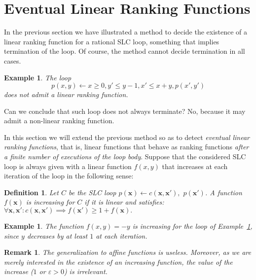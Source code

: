 \documentclass{acm_proc_article-sp}
\newtheorem{definition}[theorem]{Definition}
\newtheorem{example}[theorem]{Example}
\newtheorem{remark}[theorem]{Remark}
\newcommand{\itc}{\mathrel{:}}
\begin{document}
\section{Eventual Linear Ranking Functions}
\label{sec:eventual-linear-ranking-functions}

In the previous section we have illustrated a method to decide
the existence of a linear ranking function for a rational SLC loop,
something that implies termination of the loop.
Of course, the method cannot decide termination in all cases.

\begin{example}
\label{ex-fn-rng-lin-evt-p}
The loop
\[
  p(x, y) \leftarrow x \ge 0, y' \le y - 1, x' \le x + y, p(x', y')
\]
does not admit a linear ranking function.
\end{example}

Can we conclude that such loop does not always terminate?
No, because it may admit a non-linear ranking function.

In this section we will extend the previous method so as to detect
\emph{eventual linear ranking functions}, that is, linear functions
that behave as ranking functions
\emph{after a finite number of executions of the loop body}.
Suppose that the considered SLC loop is always given with
a linear function $f(x, y)$ that increases at each
iteration of the loop in the following sense:

\begin{definition}
\label{def-inc-lin-fn}
Let $C$ be the SLC loop
$p(\mathbf{x}) \leftarrow c(\mathbf{x}, \mathbf{x}'),$ $p(\mathbf{x}')$.
A function $f(\mathbf{x})$ is \emph{increasing for $C$}
if it is linear and satisfies:
$
  \forall \mathbf{x}, \mathbf{x}'
    \itc
      c(\mathbf{x}, \mathbf{x}')
        \implies f(\mathbf{x}') \ge 1 + f(\mathbf{x}).
$
\end{definition}

\begin{example}
\label{ex-fn-rng-lin-evt-f}
The function $f(x, y) = -y$ is increasing for the loop of
\textup{Example~\ref{ex-fn-rng-lin-evt-p}}, since $y$ decreases by at
least $1$ at each iteration.
\end{example}

\begin{remark}
The generalization to affine functions  is useless.
Moreover, as we are merely interested in the existence of an
increasing function, the value of the increase ($1$ or $\varepsilon > 0$)
is irrelevant.
\end{remark}
\end{document}
